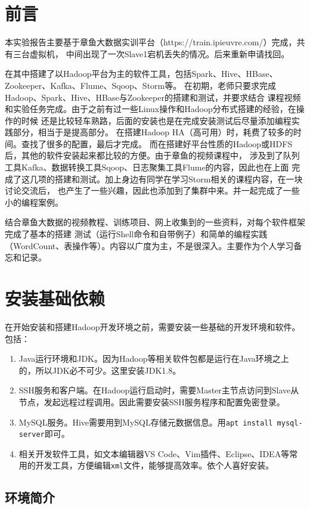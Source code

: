 
\section{前言}

本实验报告主要基于章鱼大数据实训平台（https://train.ipieuvre.com/）完成，共有三台虚拟机，
中间出现了一次Slave1宕机丢失的情况。后来重新申请找回。

在其中搭建了以Hadoop平台为主的软件工具，包括Spark、Hive、HBase、Zookeeper、Kafka、Flume、Sqoop、Storm等。
在初期，老师只要求完成Hadoop、Spark、Hive、HBase与Zookeeper的搭建和测试，并要求结合
课程视频和实验任务完成。由于之前有过一些Linux操作和Hadoop分布式搭建的经验，在操作的时候
还是比较轻车熟路，后面的安装也是在完成安装测试后尽量添加编程实践部分，相当于是提高部分。
在搭建Hadoop HA（高可用）时，耗费了较多的时间。查找了很多的配置，最后才完成。
而在搭建好平台性质的Hadoop或HDFS后，其他的软件安装起来都比较的方便。由于章鱼的视频课程中，
涉及到了队列工具Kafka、数据转换工具Sqoop、日志聚集工具Flume的内容，因此也在上面
完成了这几项的搭建和测试。加上身边有同学在学习Storm相关的课程内容，在一块讨论交流后，
也产生了一些兴趣，因此也添加到了集群中来。并一起完成了一些小的编程案例。

结合章鱼大数据的视频教程、训练项目、网上收集到的一些资料，对每个软件框架完成了基本的搭建
测试（运行Shell命令和自带例子）和简单的编程实践（WordCount、表操作等）。内容以广度为主，不是很深入。主要作为个人学习备忘和记录。

\section{安装基础依赖}
在开始安装和搭建Hadoop开发环境之前，需要安装一些基础的开发环境和软件。包括：
\begin{enumerate}
	\item Java运行环境和JDK。因为Hadoop等相关软件包都是运行在Java环境之上的，所以JDK必不可少。这里安装JDK1.8。
	\item SSH服务和客户端。在Hadoop运行启动时，需要Master主节点访问到Slave从节点，发起远程过程调用。因此需要安装SSH服务程序和配置免密登录。
	\item MySQL服务。Hive需要用到MySQL存储元数据信息。用\lstinline{apt install mysql-server}即可。
	\item 相关开发软件工具，如文本编辑器VS Code、Vim插件、Eclipse、IDEA等常用的开发工具，方便编辑\lstinline{xml}文件，能够提高效率。依个人喜好安装。
\end{enumerate}

\subsection{环境简介}

